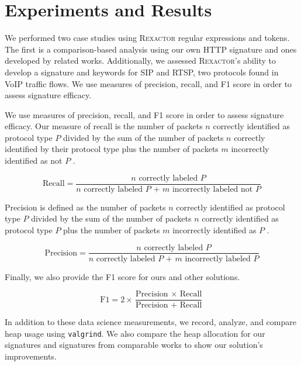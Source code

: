 \section{Experiments and Results}

We performed two case studies using \textsc{Rexactor} regular expressions and tokens. The first is a comparison-based analysis using our own HTTP signature and ones developed by related works. Additionally, we assessed \textsc{Rexactor}'s ability to develop a signature and keywords for SIP and RTSP, two protocols found in VoIP traffic flows. We use measures of precision, recall, and F1 score in order to assess signature efficacy.

We use measures of precision, recall, and F1 score in order to assess signature efficacy. Our measure of recall is the number of packets $n$ correctly identified as protocol type $P$ divided by the sum of the number of packets $n$ correctly identified by their protocol type plus the number of packets $m$ incorrectly identified as not $P$ \cite{Zhang}.

\vspace{\baselineskip}
\[\text{Recall} = \frac{\text{$n$ correctly labeled $P$}}{\text{$n$ correctly labeled $P$ + $m$ incorrectly labeled not $P$}}\] \par
\vspace{\baselineskip}

Precision is defined as the number of packets $n$ correctly identified as protocol type $P$ divided by the sum of the number of packets $n$ correctly identified as protocol type $P$ plus the number of packets $m$ incorrectly identified as $P$ \cite{Zhang}.

\vspace{\baselineskip}
\[\text{Precision} = \frac{\text{$n$ correctly labeled $P$}}{\text{$n$ correctly labeled $P$ + $m$ incorrectly labeled $P$}}\] \par
\vspace{\baselineskip}

Finally, we also provide the F1 score for ours and other solutions.

\vspace{\baselineskip}
\[\text{F1} = 2 \times \frac{\text{Precision $\times$ Recall}}{\text{Precision + Recall}}\] \par
\vspace{\baselineskip}

In addition to these data science measurements, we record, analyze, and compare heap usage using \texttt{valgrind}. We also compare the heap allocation for our signatures and signatures from comparable works to show our solution's improvements.

